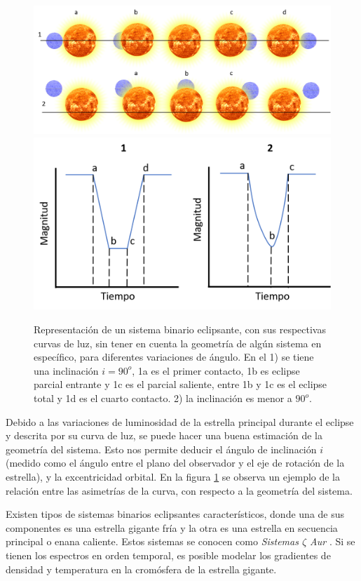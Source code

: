 \documentclass[12pt,oneside,openany,letter]{book}
\begin{document}
\begin{figure}[h]
    \centering
    \includegraphics[width=1\linewidth]{Images/representacion_eclipse.png}
    \includegraphics[width=0.62\linewidth]{Images/curva_luz_.png}
    \caption[Representación de un sistema binario eclipsante, con sus respectivas curvas de luz.]{Representación de un sistema binario eclipsante, con sus respectivas curvas de luz, sin tener en cuenta la geometría de algún sistema en específico, para diferentes variaciones de ángulo. En el 1) se tiene una inclinación $i = 90^{o}$, 1a es el primer contacto, 1b es eclipse parcial entrante y 1c es el parcial saliente, entre 1b y 1c es el eclipse total y 1d es el cuarto contacto. 2) la inclinación es menor a $90^{o}$.}
    \label{representacion_eclipse}
\end{figure}

\noindent Debido a las variaciones de luminosidad de la estrella principal durante el eclipse y descrita por su curva de luz, se puede hacer una buena estimación de la geometría del sistema. Esto nos permite deducir el ángulo de inclinación $i$ (medido como el ángulo entre el plano del observador y el eje de rotación de la estrella), y la excentricidad orbital. En la figura \ref{representacion_eclipse} se observa un ejemplo de la relación entre las asimetrías de la curva, con respecto a la geometría del sistema.



\noindent Existen tipos de sistemas binarios eclipsantes característicos, donde una de sus componentes es una estrella gigante fría y la otra es una estrella en secuencia principal o enana caliente. Estos sistemas se conocen como \textit{Sistemas $\zeta$ Aur} \citep{ake2015giants}. Si se tienen los espectros en orden temporal, es posible modelar los gradientes de densidad y temperatura en la cromósfera de la estrella gigante.
\end{document}
